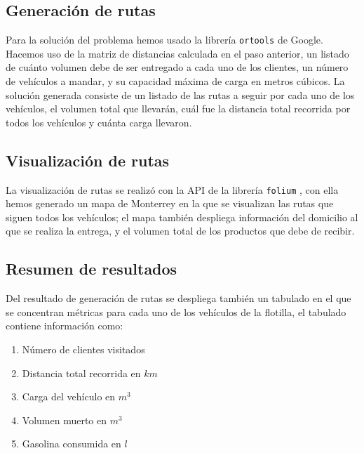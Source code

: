 \documentclass[journal]{IEEEtran}
\begin{document}
        \subsection{Generación de rutas} \label{stage 4}
        
            Para la solución del problema hemos usado la librería \texttt{ortools} \cite{ortools} de Google. Hacemos uso de la matriz de distancias calculada en el paso anterior, un listado de cuánto volumen debe de ser entregado a cada uno de los clientes, un número de vehículos a mandar, y su capacidad máxima de carga en metros cúbicos. La solución generada consiste de un listado de las rutas a seguir por cada uno de los vehículos, el volumen total que llevarán, cuál fue la distancia total recorrida por todos los vehículos y cuánta carga llevaron.

        \subsection{Visualización de rutas} 
            
            La visualización de rutas se realizó con la API de la librería \texttt{folium} \cite{folium}, con ella hemos generado un mapa de Monterrey en la que se visualizan las rutas que siguen todos los vehículos; el mapa también despliega información del domicilio al que se realiza la entrega, y el volumen total de los productos que debe de recibir.
        
        \subsection{Resumen de resultados}

            Del resultado de generación de rutas se despliega también un tabulado en el que se concentran métricas para cada uno de los vehículos de la flotilla, el tabulado contiene información como:
            \begin{enumerate}
                \item Número de clientes visitados
                \item Distancia total recorrida en $km$
                \item Carga del vehículo en $m^{3}$
                \item Volumen muerto en $m^{3}$
                \item Gasolina consumida en $l$
            \end{enumerate}
\end{document}
